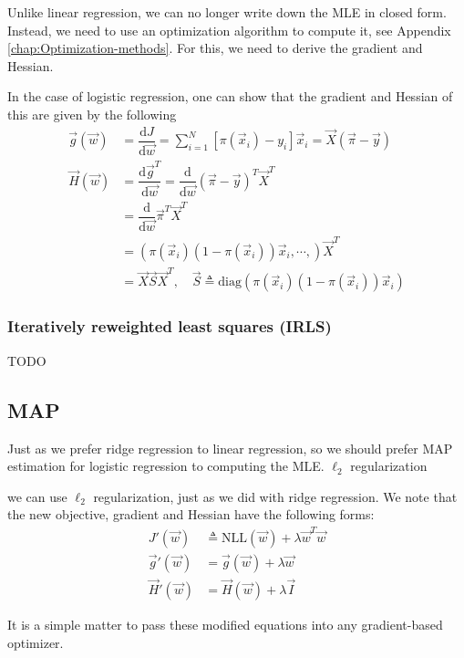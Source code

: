 Unlike linear regression, we can no longer write down the MLE in closed form. Instead, we need to use an optimization algorithm to compute it, see Appendix \ref{chap:Optimization-methods}. For this, we need to derive the gradient and Hessian.

In the case of logistic regression, one can show that the gradient and Hessian of this are given by the following
\begin{align}
\vec{g}(\vec{w}) &= \dfrac{\mathrm{d} J}{\mathrm{d} \vec{w}} = \sum\limits_{i=1}^N \left[\pi(\vec{x}_i) - y_i \right]\vec{x}_i = \vec{X}(\vec{\pi}-\vec{y})\\
\vec{H}(\vec{w}) &= \dfrac{\mathrm{d} \vec{g}^T}{\mathrm{d} \vec{w}}= \dfrac{\mathrm{d}}{\mathrm{d} \vec{w}} (\vec{\pi}-\vec{y})^T\vec{X}^T \nonumber \\
        &= \dfrac{\mathrm{d}}{\mathrm{d} \vec{w}} \vec{\pi}^T\vec{X}^T \nonumber \\
		&= (\pi(\vec{x}_i)(1-\pi(\vec{x}_i))\vec{x}_i, \cdots,)\vec{X}^T \nonumber \\
		&= \vec{X}\vec{S}\vec{X}^T, \quad \vec{S} \triangleq \mathrm{diag}(\pi(\vec{x}_i)(1-\pi(\vec{x}_i))\vec{x}_i)
\end{align}


\subsubsection{Iteratively reweighted least squares (IRLS)}
\label{sec:IRLS}
TODO


\subsection{MAP}
Just as we prefer ridge regression to linear regression, so we should prefer MAP estimation for logistic regression to computing the MLE. 
$\ell_2$ regularization

we can use $\ell_2$ regularization, just as we did with ridge regression. We note that the new objective, gradient and Hessian have the following forms:
\begin{align}
J'(\vec{w}) & \triangleq \mathrm{NLL}(\vec{w})+\lambda \vec{w}^T\vec{w} \\
\vec{g}'(\vec{w}) &= \vec{g}(\vec{w})+\lambda\vec{w} \\
\vec{H}'(\vec{w}) &= \vec{H}(\vec{w})+\lambda\vec{I}
\end{align}

It is a simple matter to pass these modified equations into any gradient-based optimizer.


